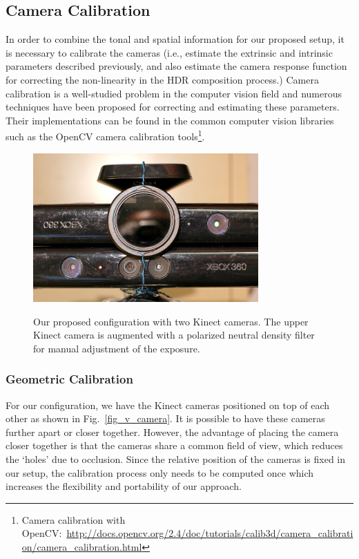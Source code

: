 \subsection{Camera Calibration}
In order to combine the tonal and spatial information for our proposed setup, it is necessary to calibrate the cameras (i.e., estimate the extrinsic and intrinsic parameters described previously, and also estimate the camera response function for correcting the non-linearity in the HDR composition process.) Camera calibration is a well-studied problem in the computer vision field and numerous techniques have been proposed \cite{zhang2000flexible, mannist, robertson2003estimation} for correcting and estimating these parameters. Their implementations can be found in the common computer vision libraries such as the OpenCV camera calibration tools\footnote{Camera calibration with OpenCV:~\url{http://docs.opencv.org/2.4/doc/tutorials/calib3d/camera_calibration/camera_calibration.html}}.
\begin{figure}
\centering
\includegraphics[width=3.4in]{ch4/diagrams/kinect_closeup} \\
\caption{Our proposed configuration with two Kinect cameras. The upper Kinect camera is augmented with a polarized neutral density filter for manual adjustment of the exposure.}
\label{fig_multiple_camera}
\end{figure}



\subsubsection{Geometric Calibration}
For our configuration, we have the Kinect cameras positioned on top of each other as shown in Fig.~\ref{fig_v_camera}. It is possible to have these cameras further apart or closer together. However, the advantage of placing the camera closer together is that the cameras share a common field of view, which reduces the `holes' due to occlusion. Since the relative position of the cameras is fixed in our setup, the calibration process only needs to be computed once which increases the flexibility and portability of our approach.


